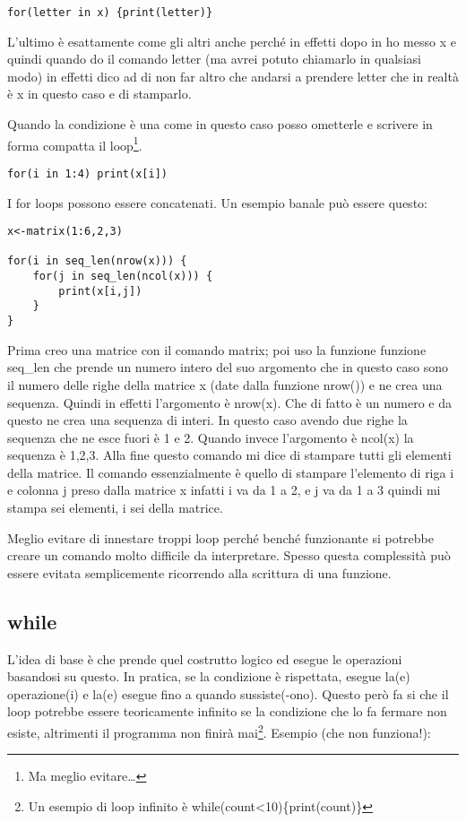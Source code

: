 \begin{lstlisting}
for(letter in x) {print(letter)}
\end{lstlisting}

L'ultimo è esattamente come gli altri anche perché in effetti dopo in ho messo x e quindi quando do il comando letter (ma avrei potuto chiamarlo in qualsiasi modo) in effetti dico ad \erre di non far altro che andarsi a prendere letter che in realtà è x in questo caso e di stamparlo.

Quando la condizione è una come in questo caso posso ometterle e scrivere in forma compatta il loop\footnote{Ma meglio evitare\dots}.

\begin{lstlisting}
for(i in 1:4) print(x[i])
\end{lstlisting}

I for loops possono essere concatenati.
Un esempio banale può essere questo:

\begin{lstlisting}
x<-matrix(1:6,2,3)

for(i in seq_len(nrow(x))) {
	for(j in seq_len(ncol(x))) {
		print(x[i,j])
	}
}
\end{lstlisting}

Prima creo una matrice con il comando matrix; poi uso la funzione funzione seq\_len che prende un numero intero del suo argomento che in questo caso sono il numero delle righe della matrice x (date dalla funzione nrow()) e ne crea una sequenza. Quindi in effetti l'argomento è nrow(x). Che di fatto è un numero e da questo ne crea
una sequenza di interi. In questo caso avendo due righe la sequenza che ne esce fuori è
1 e 2.
Quando invece l'argomento è ncol(x) la sequenza è 1,2,3.
Alla fine questo comando mi dice di stampare tutti gli elementi della matrice.
Il comando essenzialmente è quello di stampare l'elemento di riga i e colonna j preso
dalla matrice x infatti i va da 1 a 2, e j va da 1 a 3 quindi mi stampa sei elementi, i sei della matrice.

Meglio evitare di innestare troppi loop perché benché funzionante si potrebbe creare un comando molto difficile da interpretare. Spesso questa complessità può essere evitata semplicemente ricorrendo alla scrittura di una funzione.

\subsection{while}

L'idea di base è che \erre prende quel costrutto logico ed esegue le operazioni basandosi su questo.
In pratica, se la condizione è rispettata, \erre esegue la(e) operazione(i) e la(e) esegue fino a quando sussiste(-ono). Questo però
fa si che il loop potrebbe essere teoricamente infinito se la condizione che lo fa fermare
non esiste, altrimenti il programma non finirà mai\footnote{Un esempio di loop infinito è while(count<10)\{print(count)\} }.
Esempio (che non funziona!):

